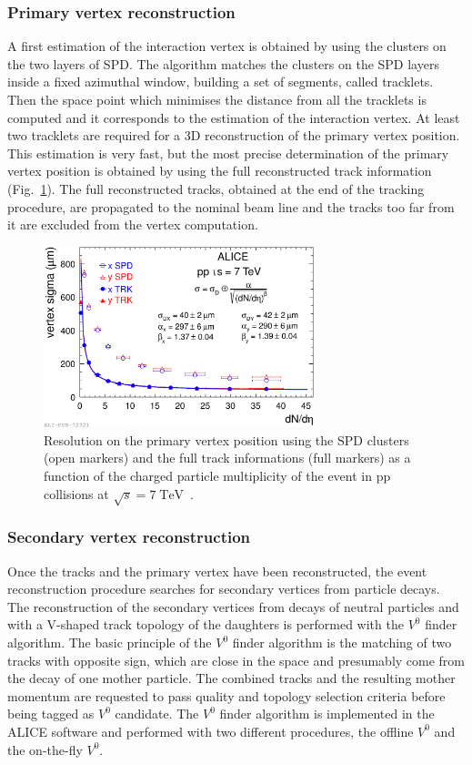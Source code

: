 \subsubsection{Primary vertex reconstruction}
A first estimation of the interaction vertex is obtained by using the clusters on the two layers of 
SPD. The algorithm matches the clusters on the SPD layers inside a fixed azimuthal window,
building a set of segments, called tracklets.
Then the space point which minimises the distance from all the tracklets is computed and it corresponds to the estimation of
the interaction vertex.
At least two tracklets are required for a 3D reconstruction of the primary vertex position.
This estimation is very fast, but the most precise determination of the primary vertex position is 
obtained by using the full reconstructed track information (Fig.~\ref{fig:vertres}).
The full reconstructed tracks, obtained at the end of the tracking procedure, are propagated to the
nominal beam line and the tracks too far from it are excluded from the vertex computation.

\begin{figure}
    \centering
    \includegraphics[width=0.7\textwidth]{gfx/vertexres}
	\caption{Resolution on the primary vertex position using the SPD clusters (open markers) and the full track informations (full markers) as a function of the charged particle multiplicity of the event in pp collisions at $\sqrt{s} = 7\; \mathrm{TeV}$~\cite{alicemulti}.}
	\label{fig:vertres}
\end{figure}

\subsubsection{Secondary vertex reconstruction}
Once the tracks and the primary vertex have been reconstructed, the event reconstruction procedure
searches for secondary vertices from particle decays.
The reconstruction of the secondary vertices from decays of neutral particles and with a V-shaped 
track topology of the daughters is performed with the $V^{0}$ finder algorithm.
The basic principle of the $V^{0}$ finder algorithm is the matching of two tracks with opposite sign,
which are close in the space and presumably come from the decay of one mother particle.
The combined tracks and the resulting mother momentum are requested to pass quality and topology
selection criteria before being tagged as $V^{0}$ candidate.
The $V^{0}$ finder algorithm is implemented in the ALICE software and performed with two different
procedures, the offline $V^{0}$ and the on-the-fly $V^{0}$.

